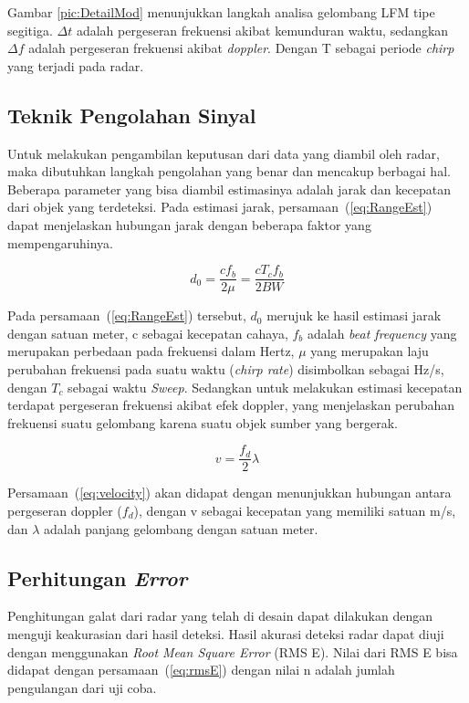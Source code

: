 Gambar \ref{pic:DetailMod} menunjukkan langkah analisa gelombang LFM tipe segitiga. $\Delta t$ adalah pergeseran frekuensi akibat kemunduran waktu, sedangkan $\Delta f$ adalah pergeseran frekuensi akibat \textit{doppler}. Dengan T sebagai periode \textit{chirp} yang terjadi pada radar.

\subsection{Teknik Pengolahan Sinyal}
Untuk melakukan pengambilan keputusan dari data yang diambil oleh radar, maka dibutuhkan langkah pengolahan yang benar dan mencakup berbagai hal. Beberapa parameter yang bisa diambil estimasinya adalah jarak dan kecepatan dari objek yang terdeteksi. Pada estimasi jarak, persamaan~(\ref{eq:RangeEst}) dapat menjelaskan hubungan jarak dengan beberapa faktor yang mempengaruhinya.

\begin{equation}
	d_{0} = \frac{c f_{b}}{2 \mu} = \frac{c T_{c} f_{b}}{2 BW}
	\label{eq:RangeEst}
\end{equation}

Pada persamaan~(\ref{eq:RangeEst}) tersebut, $d_{0}$ merujuk ke hasil estimasi jarak dengan satuan meter,  c sebagai kecepatan cahaya, $f_{b}$ adalah \textit{beat frequency} yang merupakan perbedaan pada frekuensi dalam Hertz, $\mu$ yang merupakan laju perubahan frekuensi pada suatu waktu (\textit{chirp rate}) disimbolkan sebagai Hz/s, dengan $T_{c}$ sebagai waktu \textit{Sweep}. Sedangkan untuk melakukan estimasi kecepatan terdapat pergeseran frekuensi akibat efek doppler, yang menjelaskan perubahan frekuensi suatu gelombang karena suatu objek sumber yang bergerak. 

\begin{equation}
	v = \frac{f_{d}}{2}\lambda
	\label{eq:velocity}
\end{equation}

Persamaan~(\ref{eq:velocity}) akan didapat dengan menunjukkan hubungan antara pergeseran doppler ($f_{d}$), dengan v sebagai kecepatan yang memiliki satuan m/s, dan $\lambda$ adalah panjang gelombang dengan satuan meter. 

\subsection{Perhitungan \textit{Error}}
Penghitungan galat dari radar yang telah di desain dapat dilakukan dengan menguji keakurasian dari hasil deteksi. Hasil akurasi deteksi radar dapat diuji dengan menggunakan \textit{Root Mean Square Error} (RMS E). Nilai dari RMS E bisa didapat dengan persamaan~(\ref{eq:rmsE}) dengan nilai n adalah jumlah pengulangan dari uji coba.

